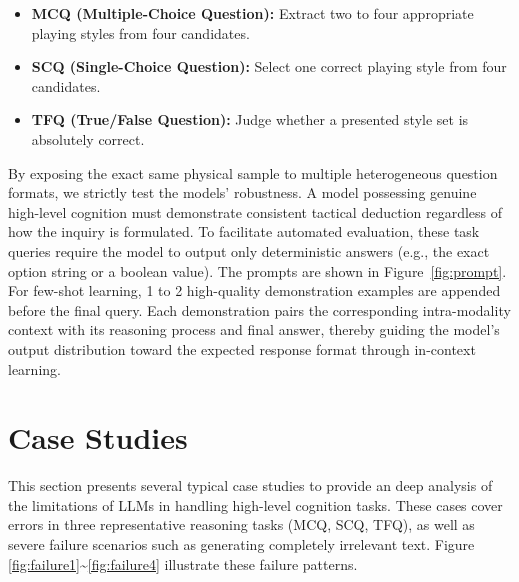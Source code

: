 \begin{itemize}
    \item \textbf{MCQ (Multiple-Choice Question):} Extract two to four appropriate playing styles from four candidates.
    \item \textbf{SCQ (Single-Choice Question):} Select one correct playing style from four candidates.
    \item \textbf{TFQ (True/False Question):} Judge whether a presented style set is absolutely correct.
\end{itemize}

By exposing the exact same physical sample to multiple heterogeneous question formats, we strictly test the models' robustness. A model possessing genuine high-level cognition must demonstrate consistent tactical deduction regardless of how the inquiry is formulated. To facilitate automated evaluation, these task queries require the model to output only deterministic answers (e.g., the exact option string or a boolean value). The prompts are shown in Figure~\ref{fig:prompt}. For few-shot learning, 1 to 2 high-quality demonstration examples are appended before the final query. Each demonstration pairs the corresponding intra-modality context with its reasoning process and final answer, thereby guiding the model's output distribution toward the expected response format through in-context learning.






\section{Case Studies}
\label{app:Case Studies}
This section presents several typical case studies to provide an deep analysis of the limitations of  LLMs in handling high-level cognition tasks. These cases cover errors in three representative reasoning tasks (MCQ, SCQ, TFQ), as well as severe failure scenarios such as generating completely irrelevant text. Figure \ref{fig:failure1}\textasciitilde \ref{fig:failure4} illustrate these failure patterns.



